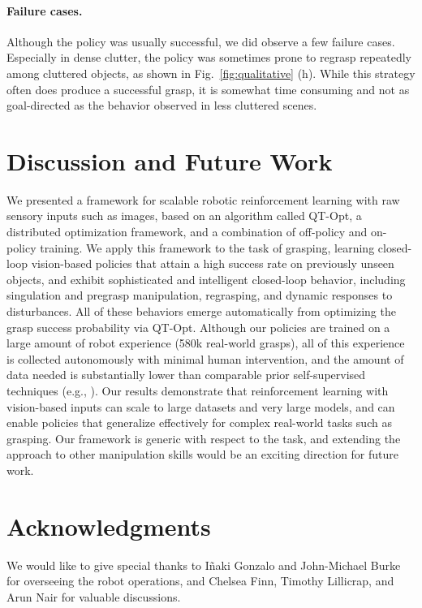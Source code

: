 \documentclass{article}
\newcommand{\numgrasps}{{580k}} %
\begin{document}
\vspace{-0.12in}
\paragraph{Failure cases.}
Although the policy was usually successful, we did observe a few failure cases. Especially in dense clutter, the policy was sometimes prone to regrasp repeatedly among cluttered objects, as shown in Fig.~\ref{fig:qualitative} (h). While this strategy often does produce a successful grasp, it is somewhat time consuming and not as goal-directed as the behavior observed in less cluttered scenes.

\vspace{-0.12in}
\section{Discussion and Future Work}
\label{sec:conclusion}

We presented a framework for scalable robotic reinforcement learning with raw sensory inputs such as images, based on an algorithm called QT-Opt, a distributed optimization framework, and a combination of off-policy and on-policy training. We apply this framework to the task of grasping, learning closed-loop vision-based policies that attain a high success rate on previously unseen objects, and exhibit sophisticated and intelligent closed-loop behavior, including singulation and pregrasp manipulation, regrasping, and dynamic responses to disturbances. All of these behaviors emerge automatically from optimizing the grasp success probability via QT-Opt. Although our policies are trained on a large amount of robot experience (\numgrasps{} real-world grasps), all of this experience is collected autonomously with minimal human intervention, and the amount of data needed is substantially lower than comparable prior self-supervised techniques (e.g., \citep{levine16}). Our results demonstrate that reinforcement learning with vision-based inputs can scale to large datasets and very large models, and can enable policies that generalize effectively for complex real-world tasks such as grasping. Our framework is generic with respect to the task, and extending the approach to other manipulation skills would be an exciting direction for future work.

\clearpage
\section*{Acknowledgments}
We would like to give special thanks to I{\~n}aki Gonzalo and John-Michael Burke for overseeing the robot operations, and Chelsea Finn, Timothy Lillicrap, and Arun Nair for valuable discussions.
\end{document}

